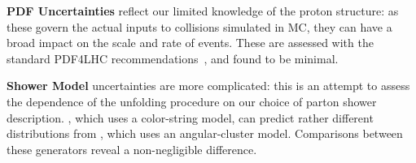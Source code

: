 	\textbf{PDF Uncertainties} reflect our limited knowledge of the proton structure: as these govern the actual inputs to collisions simulated in MC, they can have a broad impact on the scale and rate of events. These are assessed with the standard PDF4LHC recommendations~\cite{Botje:2011sn}, and found to be minimal. %




  \textbf{Shower Model} uncertainties are more complicated: this is an attempt to assess the dependence of the unfolding procedure on our choice of parton shower description. \Pythia, which uses a color-string model, can predict rather different distributions from \Herwig, which uses an angular-cluster model. Comparisons between these generators reveal a non-negligible difference. %


